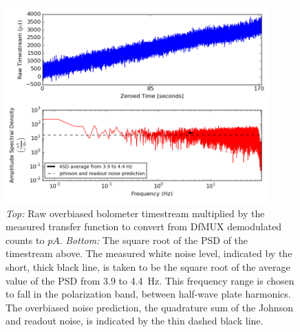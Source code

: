 \documentclass[../EBEXPaper2.tex]{subfiles}
\begin{document}
\begin{figure}[ht!]
\begin{center}
\includegraphics[height=3in]{images/board64_wire2_ch02_1356968507s_overbias}
\caption{{\it Top:} Raw overbiased bolometer timestream multiplied by the measured transfer function to convert from \ac{DfMUX} demodulated counts to $pA$. {\it Bottom:} The square root of the \ac{PSD} of the timestream above. The measured white noise level, indicated by the short, thick black line, is taken to be the square root of the average value of the \ac{PSD} from 3.9 to 4.4~Hz. This frequency range is chosen to fall in the polarization band, between half-wave plate harmonics. The overbiased noise prediction, the quadrature sum of the Johnson and readout noise, is indicated by the thin dashed black line. }
\label{fig:one_bolo_overbias_noise}
\end{center}
\end{figure}
\end{document}
